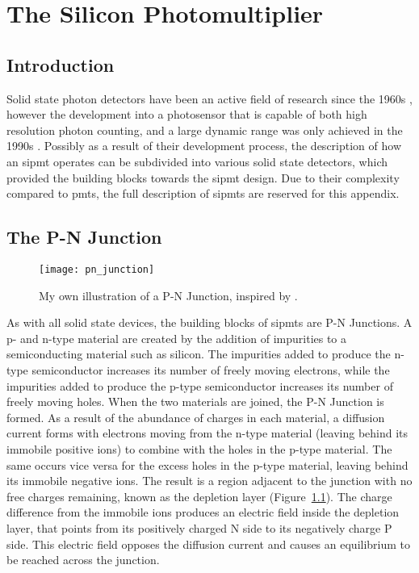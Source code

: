\chapter{\label{a1-sipm}The Silicon Photomultiplier}

\minitoc

\section{Introduction}

Solid state photon detectors have been an active field of research since the 1960s \cite{Renker2006}, however the development into a photosensor that is capable of both high resolution photon counting, and a large dynamic range was only achieved in the 1990s \cite{Otte2006}. Possibly as a result of their development process, the description of how an \gls{sipmt} operates can be subdivided into various solid state detectors, which provided the building blocks towards the \gls{sipmt} design. Due to their complexity compared to \glspl{pmt}, the full description of \glspl{sipmt} are reserved for this appendix.

\section{The P-N Junction}

\begin{figure}
	\centering
    \texttt{[image: pn\_junction]} 
	\caption[A typical illustration of a P-N Junction.]{My own illustration of a P-N Junction, inspired by \textcite{Ghassemi2017}.}
	\label{fig:pn_junction}
\end{figure}

As with all solid state devices, the building blocks of \glspl{sipmt} are P-N Junctions. A p- and n-type material are created by the addition of impurities to a semiconducting material such as silicon. The impurities added to produce the n-type semiconductor increases its number of freely moving electrons, while the impurities added to produce the p-type semiconductor increases its number of freely moving holes. When the two materials are joined, the P-N Junction is formed. As a result of the abundance of charges in each material, a diffusion current forms with electrons moving from the n-type material (leaving behind its immobile positive ions) to combine with the holes in the p-type material. The same occurs vice versa for the excess holes in the p-type material, leaving behind its immobile negative ions. The result is a region adjacent to the junction with no free charges remaining, known as the depletion layer (Figure~\ref{fig:pn_junction}). The charge difference from the immobile ions  produces an electric field inside the depletion layer, that points from its positively charged N side to its negatively charge P side. This electric field opposes the diffusion current and causes an equilibrium to be reached across the junction.

